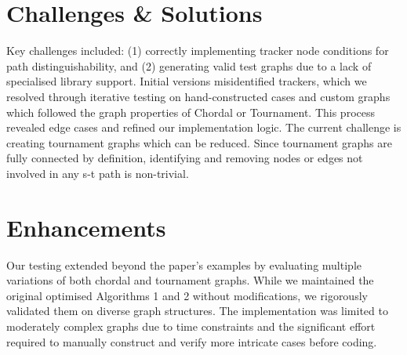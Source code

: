 \documentclass{article}
\begin{document}
\section*{Challenges \& Solutions}
Key challenges included: (1) correctly implementing tracker node conditions for path distinguishability, and (2) generating valid test graphs due to a lack of specialised library support. Initial versions misidentified trackers, which we resolved through iterative testing on hand-constructed cases and custom graphs which followed the graph properties of Chordal or Tournament. This process revealed edge cases and refined our implementation logic. The current challenge is creating tournament graphs which can be reduced. Since tournament graphs are fully connected by definition, identifying and removing nodes or edges not involved in any s-t path is non-trivial.

\section*{Enhancements}
Our testing extended beyond the paper's examples by evaluating multiple variations of both chordal and tournament graphs. While we maintained the original optimised Algorithms 1 and 2 without modifications, we rigorously validated them on diverse graph structures. The implementation was limited to moderately complex graphs due to time constraints and the significant effort required to manually construct and verify more intricate cases before coding. 
\end{document}
